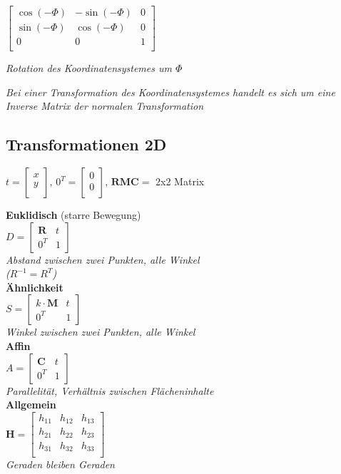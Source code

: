 $ \begin{bmatrix}
    \cos(-\Phi) & -\sin(-\Phi) & 0 \\
    \sin(-\Phi) & \cos(-\Phi) & 0 \\
    0 & 0 & 1 \\
\end{bmatrix}$

\textit{Rotation des Koordinatensystemes um $\Phi$}

\textit{Bei einer Transformation des Koordinatensystemes
handelt es sich um eine Inverse Matrix der normalen
Transformation}

\subsection{Transformationen 2D}

$t=\begin{bmatrix}
    x \\
    y \\
\end{bmatrix}$, $0^T = \begin{bmatrix}
    0 \\
    0 \\
\end{bmatrix}$, $\mathbf{RMC} =$ 2x2 Matrix

\textbf{Euklidisch} (starre Bewegung) \\
$D = \begin{bmatrix}
    \mathbf{R} & t \\
    0^T & 1
\end{bmatrix}$ \\
\textit{Abstand zwischen zwei Punkten, alle Winkel} \\
\textit{($R^{-1} = R^T$)} \\

\textbf{Ähnlichkeit} \\
$S = \begin{bmatrix}
    k \cdot \mathbf{M} & t \\
    0^T & 1
\end{bmatrix}$ \\
\textit{Winkel zwischen zwei Punkten, alle Winkel} \\

\textbf{Affin} \\
$A = \begin{bmatrix}
    \mathbf{C} & t \\
    0^T & 1
\end{bmatrix}$ \\
\textit{Parallelität, Verhältnis zwischen Flächeninhalte} \\

\textbf{Allgemein} \\
$\mathbf{H} = \begin{bmatrix}
    h_{11} & h_{12} & h_{13} \\
    h_{21} & h_{22} & h_{23} \\
    h_{31} & h_{32} & h_{33} \\
\end{bmatrix}$ \\
\textit{Geraden bleiben Geraden} \\